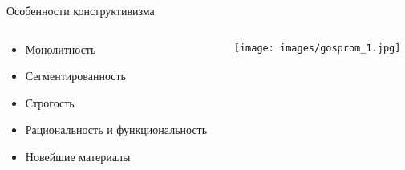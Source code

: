 \begin{frame}{Особенности конструктивизма}
    \begin{columns}[T,onlytextwidth]
        \begin{column}{0.44\textwidth}
            \begin{itemize}
                \item<1-> Монолитность
                \item<2-> Сегментированность
                \item<3-> Строгость
                \item<4-> Рациональность и функциональность
                \item<5-> Новейшие материалы
            \end{itemize}
        \end{column}
        \begin{column}{0.56\textwidth}
            \texttt{[image: images/gosprom\_1.jpg]}
        \end{column}
    \end{columns}
\end{frame}
